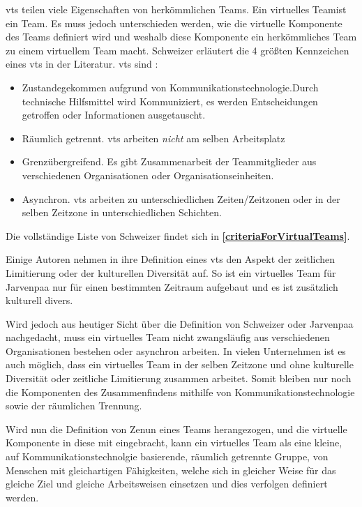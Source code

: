 \documentclass[a4paper,11pt]{article}%
\renewcommand{\\}{\vspace*{0.5\baselineskip} \newline}
\begin{document}
\ac{vts} teilen viele Eigenschaften von herkömmlichen Teams. Ein \dq virtuelles Team\dq ist ein \dq Team\dq. Es muss jedoch unterschieden werden, wie die virtuelle Komponente des Teams definiert wird und weshalb diese Komponente ein herkömmliches Team zu einem virtuellem Team macht. 
\label{AnforderungenLautSchweitzer}
Schweizer \citep[p.270]{schweitzer2010conceptualizing} erläutert die 4 größten Kennzeichen eines \ac{vts} in der Literatur.
\ac{vts} sind :
\begin{itemize}
\item Zustandegekommen aufgrund von Kommunikationstechnologie.Durch technische Hilfsmittel wird Kommuniziert, es werden Entscheidungen getroffen oder Informationen ausgetauscht.
\item Räumlich getrennt. \ac{vts} arbeiten \textit{nicht} am selben Arbeitsplatz
\item Grenzübergreifend. Es gibt Zusammenarbeit der Teammitglieder aus verschiedenen Organisationen oder Organisationseinheiten.
\item Asynchron. \ac{vts} arbeiten zu unterschiedlichen Zeiten/Zeitzonen oder in der selben Zeitzone in unterschiedlichen Schichten.
\end{itemize}

Die vollständige Liste von Schweizer findet sich in \textbf{\autoref{criteriaForVirtualTeams}}.

Einige Autoren nehmen in ihre Definition eines \ac{vts} den Aspekt der zeitlichen Limitierung oder der kulturellen Diversität auf. So ist ein virtuelles Team für Jarvenpaa \citep[p.1-2]{jarvenpaa1999communication} nur für einen bestimmten Zeitraum aufgebaut und es ist zusätzlich kulturell divers. 

Wird jedoch aus heutiger Sicht über die Definition von Schweizer oder Jarvenpaa nachgedacht, muss ein virtuelles Team nicht zwangsläufig aus verschiedenen Organisationen bestehen oder asynchron arbeiten. In vielen Unternehmen ist es auch möglich, dass ein virtuelles Team in der selben Zeitzone und ohne kulturelle Diversität oder zeitliche Limitierung zusammen arbeitet.
Somit bleiben nur noch die Komponenten des Zusammenfindens mithilfe von Kommunikationstechnologie sowie der räumlichen Trennung.

Wird nun die Definition von Zenun \citep[p.2]{zenun2007effects} eines Teams herangezogen, und die virtuelle Komponente in diese mit eingebracht, kann ein virtuelles Team als \\
\dq{}eine kleine, auf Kommunikationstechnolgie basierende, räumlich getrennte Gruppe, von Menschen mit gleichartigen Fähigkeiten, welche sich in gleicher Weise für das gleiche Ziel und gleiche Arbeitsweisen einsetzen und dies verfolgen\dq{} \\
definiert werden.
\end{document}
